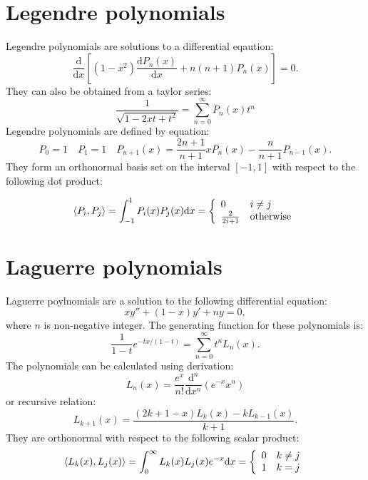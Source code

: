 \documentclass[openany, longbibliography,slovene,a4paper,12pt]{article}
\newcommand{\dif}{\mathrm{d}}
\begin{document}
\section{Legendre polynomials}
Legendre polynomials are solutions to a differential eqaution:
\begin{equation}
  \frac{\dif}{\dif x}\left[ (1-x^2)\frac{\dif P_n(x)}{\dif x} + n(n+1)P_n(x) \right] =0.
\end{equation}
They can also be obtained from a taylor series:
\begin{equation}
  \frac{1}{\sqrt{1-2xt+t^2}}=\sum_{n=0}^{\infty} P_n(x)t^n
  \end{equation}
Legendre polynomials are defined by equation:
\begin{equation}
  P_0 = 1 \quad P_1=1 \quad P_{n+1}(x)=\frac{2n+1}{n+1}xP_{n}(x) -  \frac{n}{n+1}P_{n-1}(x).
\end{equation}
They form an orthonormal basis set on the interval $[-1,1]$ with respect to the
following dot product:

\[   \braket{P_i, P_j}=\int_{-1}^{1} P_i(x) P_j(x) \dif x=
  \left\{
\begin{array}{ll}
      0 & i\neq j \\
      \frac{2}{2i+1} & \mathrm{otherwise} \\
\end{array} 
\right. \]


\section{Laguerre polynomials}
Laguerre poylnomials are a solution to the following differential equation:
\begin{equation}
  xy'' + (1-x)y'+ny=0,
  \end{equation}
where $n$ is non-negative integer. The generating function for these polynomials
is:
\begin{equation}
  \frac{1}{1-t}e^{-tx/(1-t)}=\sum_{n=0}^\infty t^nL_n(x).
  \end{equation}
  The polynomials can be calculated using derivation:
  \begin{equation}
    L_n(x)=\frac{e^x}{n!}\frac{\dif^n}{\dif x^n}\left(e^{-x}x^n \right)
    \end{equation}
    or recursive relation:
    \begin{equation}
      L_{k+1}(x)=\frac{(2k+1-x)L_k(x)-kL_{k-1}(x)}{k+1}.
    \end{equation}
    They are orthonormal with respect to the following scalar product:
    \[
      \braket{L_k(x), L_j(x)}= \int_0^\infty L_k(x)L_j(x)e^{-x} \dif x =
        \left\{
\begin{array}{ll}
      0 & k\neq j \\
      1 & k=j \\
\end{array} 
\right.
\]
\end{document}
